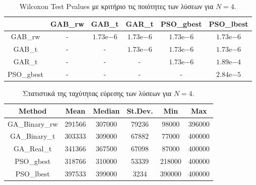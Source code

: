 \documentclass[12pt, a4paper]{article}
\newcommand{\en}{\selectlanguage{english}}
\newcommand{\gr}{\selectlanguage{greek}}
\begin{document}
\begin{table}[H]
	\centering
	\begin{tabular}{| c | c | c | c | c | c |}
		
		\hline
		\en  & \en GAB\_rw & \en GAB\_t & \en GAR\_t & \en PSO\_gbest & \en PSO\_lbest\\
		
		\hline
		\en GAB\_rw & - & $1.73\mathrm{e}{-6}$ & $1.73\mathrm{e}{-6}$ & $1.73\mathrm{e}{-6}$ & $1.73\mathrm{e}{-6}$ \\ 
		
		\hline
		\en GAB\_t & - & - & $1.73\mathrm{e}{-6}$ & $1.73\mathrm{e}{-6}$ & $1.73\mathrm{e}{-6}$ \\ 
	
		\hline
		\en GAR\_t & - & - & - & $1.73\mathrm{e}{-6}$ & $1.89\mathrm{e}{-4}$ \\ 
		
		\hline
		\en PSO\_gbest & - & - & - & - & $2.84\mathrm{e}{-5}$\\ 
		
		\hline
		
	\end{tabular}
	\caption{\en Wilcoxon Test Pvalues \gr με κριτήριο τις ποιότητες των λύσεων για $N = 4$.}
	\label{tab:sol_qual_pval_N4}
\end{table}

\begin{table}[H]
	\centering
	\begin{tabular}{| c | c | c | c | c | c |}
		
		\hline
		\en Method & \en Mean & \en Median & \en St.Dev. & \en Min & \en Max \\
		
		\hline
		\en GA\_Binary\_rw & 291566 & 307000 & 79236 & 98000 & 396000 \\ 
		
		\hline
		\en GA\_Binary\_t & 303333 & 309000 & 67882 & 77000 & 400000 \\ 
		
		\hline
		\en GA\_Real\_t & 341366 & 367500 & 67098 & 87000 & 400000 \\ 
		
		\hline
		\en PSO\_gbest &  318766 & 310000 & 53339 & 218000 & 400000\\ 
		
		\hline
		\en PSO\_lbest & 397533 & 399000 & 3234 & 390000 & 400000 \\ 
		
		\hline
		
	\end{tabular}
	\caption{Στατιστικά της ταχύτητας εύρεσης των λύσεων για $N = 4$.}
	\label{tab:iter_N4}
\end{table}
\end{document}
